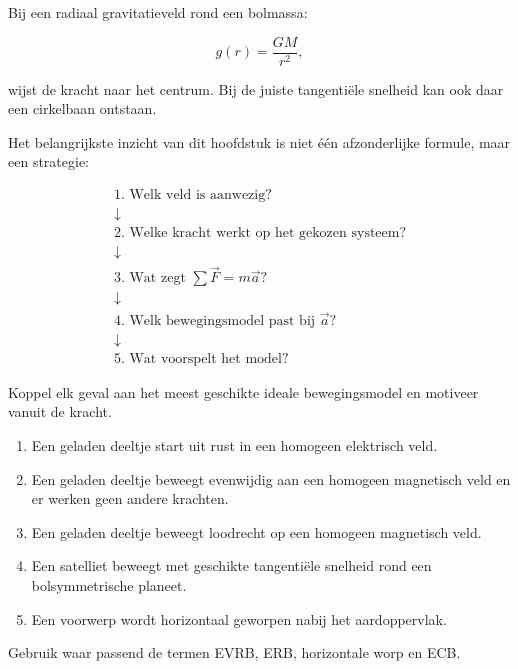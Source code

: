 \documentclass{ximera}
\begin{document}
Bij een radiaal gravitatieveld rond een bolmassa:

\[
g(r)=\frac{GM}{r^2},
\]

wijst de kracht naar het centrum. Bij de juiste tangentiële snelheid
kan ook daar een cirkelbaan ontstaan.



Het belangrijkste inzicht van dit hoofdstuk is niet één afzonderlijke
formule, maar een strategie:

\[
\boxed{
\begin{array}{c}
\text{1. Welk veld is aanwezig?}\\[2mm]
\downarrow\\[2mm]
\text{2. Welke kracht werkt op het gekozen systeem?}\\[2mm]
\downarrow\\[2mm]
\text{3. Wat zegt }\sum\vec F=m\vec a\text{?}\\[2mm]
\downarrow\\[2mm]
\text{4. Welk bewegingsmodel past bij }\vec a\text{?}\\[2mm]
\downarrow\\[2mm]
\text{5. Wat voorspelt het model?}
\end{array}
}
\]


\begin{oefening}{\oefU\ESS}

Koppel elk geval aan het meest geschikte ideale bewegingsmodel en
motiveer vanuit de kracht.

\begin{enumerate}
  \item Een geladen deeltje start uit rust in een homogeen elektrisch veld.
  \item Een geladen deeltje beweegt evenwijdig aan een homogeen magnetisch
        veld en er werken geen andere krachten.
  \item Een geladen deeltje beweegt loodrecht op een homogeen magnetisch veld.
  \item Een satelliet beweegt met geschikte tangentiële snelheid rond een
        bolsymmetrische planeet.
  \item Een voorwerp wordt horizontaal geworpen nabij het aardoppervlak.
\end{enumerate}

Gebruik waar passend de termen EVRB, ERB, horizontale worp en ECB.

\end{oefening}
\end{document}
